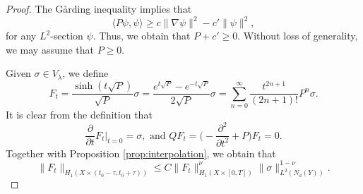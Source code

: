 \documentclass[12pt, reqno]{amsart}
\theoremstyle{plain}%
\newtheorem{theorem}{Theorem}[section]
\theoremstyle{definition}
\theoremstyle{remark}
\numberwithin{equation}{section}
\begin{document}
\begin{proof}
 The G\r{a}rding inequality implies that
	\begin{equation}
		\langle P\psi,\psi\rangle\geq c\|\nabla\psi\|^2-c'\|\psi\|^2,
	\end{equation}
	for any $L^2$-section $\psi$. Thus, we obtain that $P+c'\geq 0$. 
	Without loss of generality, we may assume that $P\geq 0$.	
	
	Given $\sigma\in V_\lambda$, we define
	$$F_t=\frac{\sinh(t\sqrt{P})}{\sqrt P}\sigma=\frac{e^{t\sqrt{P}}-e^{-t\sqrt{P}}}{2\sqrt{P}}\sigma=\sum_{n=0}^{\infty}\frac{t^{2n+1}}{(2n+1)!}P^n\sigma.$$
	It is clear from the definition that
	$$\frac{\partial}{\partial t}F_t\Big|_{t=0}=\sigma,\text{ and }QF_t=\Big(-\frac{\partial^2}{\partial t^2}+P\Big)F_t=0.$$
	Together with Proposition \ref{prop:interpolation}, we obtain that
	\begin{equation}\label{eq:interpolationFt}
			\|F_t\|_{H_1(X\times (t_0-\tau,t_0+\tau))}\leq C \|F_t\|_{H_1(X\times[0,T])}^\nu\|\sigma\|_{L^2(N_a(Y))}^{1-\nu}.
	\end{equation}
	

\end{proof}
\end{document}
